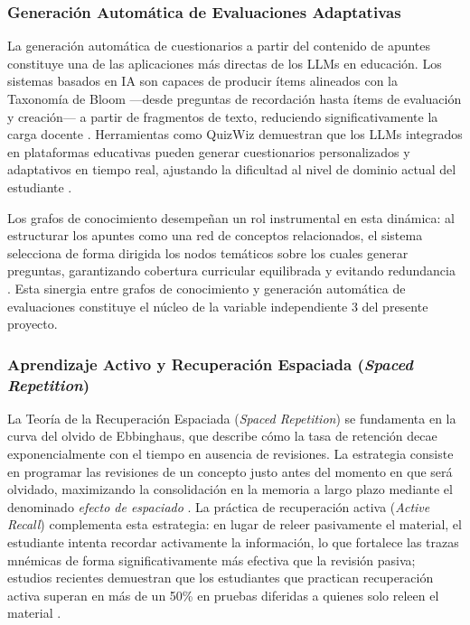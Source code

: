 \subsubsection{Generación Automática de Evaluaciones Adaptativas}

La generación automática de cuestionarios a partir del contenido de apuntes constituye 
una de las aplicaciones más directas de los LLMs en educación. Los sistemas basados en 
IA son capaces de producir ítems alineados con la Taxonomía de Bloom —desde preguntas 
de recordación hasta ítems de evaluación y creación— a partir de fragmentos de texto, 
reduciendo significativamente la carga docente \parencite{QuerIA2025}. Herramientas 
como QuizWiz demuestran que los LLMs integrados en plataformas educativas pueden 
generar cuestionarios personalizados y adaptativos en tiempo real, ajustando la 
dificultad al nivel de dominio actual del estudiante \parencite{QuizWiz2024}.

Los grafos de conocimiento desempeñan un rol instrumental en esta dinámica: al 
estructurar los apuntes como una red de conceptos relacionados, el sistema selecciona 
de forma dirigida los nodos temáticos sobre los cuales generar preguntas, garantizando 
cobertura curricular equilibrada y evitando redundancia \parencite{PersonalizedLearningKG2026}. 
Esta sinergia entre grafos de conocimiento y generación automática de evaluaciones 
constituye el núcleo de la variable independiente 3 del presente proyecto.

\subsubsection{Aprendizaje Activo y Recuperación Espaciada (\textit{Spaced Repetition})}

La Teoría de la Recuperación Espaciada (\textit{Spaced Repetition}) se fundamenta en 
la curva del olvido de Ebbinghaus, que describe cómo la tasa de retención decae 
exponencialmente con el tiempo en ausencia de revisiones. La estrategia consiste en 
programar las revisiones de un concepto justo antes del momento en que será olvidado, 
maximizando la consolidación en la memoria a largo plazo mediante el denominado 
\textit{efecto de espaciado} \parencite{Huang2025}. La práctica de recuperación activa 
(\textit{Active Recall}) complementa esta estrategia: en lugar de releer pasivamente 
el material, el estudiante intenta recordar activamente la información, lo que fortalece 
las trazas mnémicas de forma significativamente más efectiva que la revisión pasiva; 
estudios recientes demuestran que los estudiantes que practican recuperación activa 
superan en más de un 50\% en pruebas diferidas a quienes solo releen el material 
\parencite{Huang2025}.

